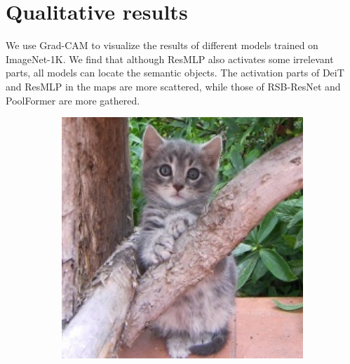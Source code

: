 \section{Qualitative results}
We use Grad-CAM \cite{gradcam} to visualize the results of different models trained on ImageNet-1K. We find that although ResMLP \cite{resmlp} also activates some irrelevant parts, all models can locate the semantic objects. The activation parts of DeiT \cite{deit} and ResMLP \cite{resmlp} in the maps are more scattered, while those of RSB-ResNet \cite{resnet_improved, resnet} and PoolFormer are more gathered. 


\begin{figure}[t]
    \centering
    \begin{subfigure}[b]{0.19\textwidth}
        \centering
        \includegraphics[width=1\textwidth]{figures/qualitative_results/ILSVRC2012_val_00023779_resize.JPEG}

\end{subfigure}
\end{figure}
